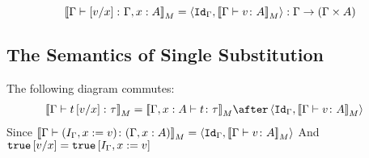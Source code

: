 {    \begin{equation}
        \deno{\gtyperelation{\ssub{x}{v}}{\gax}} = \pr{\idg}{\deno{\gtyperelation{v}{A}}}: \G\rightarrow(\G\times A)
    \end{equation}
    \subsection{The Semantics of Single Substitution}

    The following diagram commutes:
    \begin{align}
        \deno{\gtyperelation{t\ssub{x}{v}}{\tau}} &= \deno{\typerelation{\gax}{t}{\tau}}\after\pr{\idg}{\deno{\gtyperelation{v}{A}}}
    \end{align}
    Since $\deno{\gtyperelation{(I_{\G}, x\setto v)}{(\gax)}} = \pr{\idg}{\deno{\gtyperelation{v}{A}}}$
    And $\t\ssub{x}{v} = \t\sub{I_{\G}, x\setto{v}}$
    }


\ifdefined\NoDocument
\else
\documentclass{report}


    \Substitution

\fi